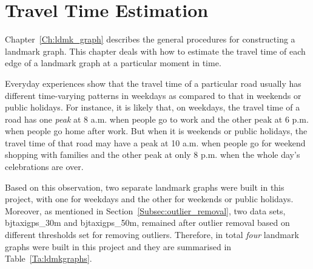 \chapter{Travel Time Estimation}
Chapter~\ref{Ch:ldmk_graph} describes the general procedures for constructing a landmark graph. This chapter deals with how to estimate the travel time of each edge of a landmark graph at a particular moment in time. 

Everyday experiences show that the travel time of a particular road usually has different time-varying patterns in weekdays as compared to that in weekends or public holidays. For instance, it is likely that, on weekdays, the travel time of a road has one \emph{peak} at 8 a.m. when people go to work and the other peak at 6 p.m. when people go home after work. But when it is weekends or public holidays, the travel time of that road may have a peak at 10 a.m. when people go for weekend shopping with families and the other peak at only 8 p.m. when the whole day's celebrations are over. 

Based on this observation, two separate landmark graphs were built in this project, with one for weekdays and the other for weekends or public holidays. Moreover, as mentioned in Section~\ref{Subsec:outlier_removal}, 
two data sets, bjtaxigps\_30m and bjtaxigps\_50m, remained after outlier removal based on different thresholds set for removing outliers. Therefore, in total \emph{four} landmark graphs were built in this project and they are summarised in Table~\ref{Ta:ldmkgraphs}.

\begin{table}[h!]
\centering
{}
\caption{An summary of landmark graphs}\label{Ta:ldmkgraphs}
\end{table}

%
%

